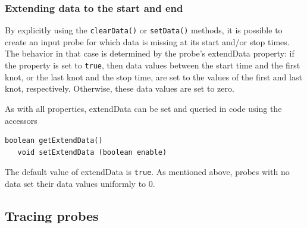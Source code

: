 \subsubsection{Extending data to the start and end}

By explicitly using the {\tt clearData()} or {\tt setData()} methods, it is
possible to create an input probe for which data is missing at its start and/or
stop times. The behavior in that case is determined by the probe's {\sf
extendData} property: if the property is set to {\tt true}, then data values
between the start time and the first knot, or the last knot and the stop time,
are set to the values of the first and last knot, respectively.  Otherwise,
these data values are set to zero.

As with all properties, {\sf extendData} can be set and queried in code using
the accessors
\begin{lstlisting}[]
   boolean getExtendData()
   void setExtendData (boolean enable)
\end{lstlisting}
%
The default value of {\sf extendData} is {\tt true}.  As mentioned above,
probes with no data set their data values uniformly to 0.

\subsection{Tracing probes}

